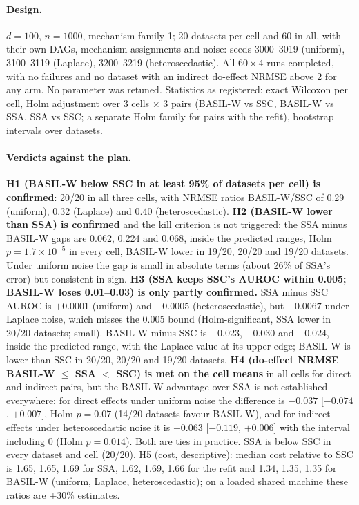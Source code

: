 \paragraph{Design.} $d=100$, $n=1000$, mechanism family 1; 20 datasets per cell and 60 in all, with their own DAGs, mechanism assignments and noise: seeds 3000--3019 (uniform), 3100--3119 (Laplace), 3200--3219 (heteroscedastic). All $60\times4$ runs completed, with no failures and no dataset with an indirect do-effect NRMSE above 2 for any arm. No parameter was retuned. Statistics as registered: exact Wilcoxon per cell, Holm adjustment over 3 cells $\times$ 3 pairs (BASIL-W vs SSC, BASIL-W vs SSA, SSA vs SSC; a separate Holm family for pairs with the refit), bootstrap intervals over datasets.

\paragraph{Verdicts against the plan.} \textbf{H1 (BASIL-W below SSC in at least 95\% of datasets per cell) is confirmed}: 20/20 in all three cells, with NRMSE ratios BASIL-W/SSC of 0.29 (uniform), 0.32 (Laplace) and 0.40 (heteroscedastic). \textbf{H2 (BASIL-W lower than SSA) is confirmed} and the kill criterion is not triggered: the SSA minus BASIL-W gaps are 0.062, 0.224 and 0.068, inside the predicted ranges, Holm $p=1.7\times10^{-5}$ in every cell, BASIL-W lower in 19/20, 20/20 and 19/20 datasets. Under uniform noise the gap is small in absolute terms (about 26\% of SSA's error) but consistent in sign. \textbf{H3 (SSA keeps SSC's AUROC within 0.005; BASIL-W loses 0.01--0.03) is only partly confirmed.} SSA minus SSC AUROC is $+0.0001$ (uniform) and $-0.0005$ (heteroscedastic), but $-0.0067$ under Laplace noise, which misses the 0.005 bound (Holm-significant, SSA lower in 20/20 datasets; small). BASIL-W minus SSC is $-0.023$, $-0.030$ and $-0.024$, inside the predicted range, with the Laplace value at its upper edge; BASIL-W is lower than SSC in 20/20, 20/20 and 19/20 datasets. \textbf{H4 (do-effect NRMSE BASIL-W $\le$ SSA $<$ SSC) is met on the cell means} in all cells for direct and indirect pairs, but the BASIL-W advantage over SSA is not established everywhere: for direct effects under uniform noise the difference is $-0.037$ [$-0.074$, $+0.007$], Holm $p=0.07$ (14/20 datasets favour BASIL-W), and for indirect effects under heteroscedastic noise it is $-0.063$ [$-0.119$, $+0.006$] with the interval including 0 (Holm $p=0.014$). Both are ties in practice. SSA is below SSC in every dataset and cell (20/20). H5 (cost, descriptive): median cost relative to SSC is 1.65, 1.65, 1.69 for SSA, 1.62, 1.69, 1.66 for the refit and 1.34, 1.35, 1.35 for BASIL-W (uniform, Laplace, heteroscedastic); on a loaded shared machine these ratios are $\pm30\%$ estimates.

